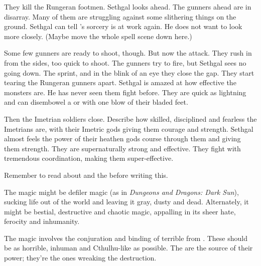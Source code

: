 They kill the Rungeran footmen.
Sethgal looks ahead. 
The gunners ahead are in disarray.
Many of them are struggling against some slithering things on the ground. 
Sethgal can tell \Shachar's sorcery is at work again. 
He does not want to look more closely. 
(Maybe move the whole spell scene down here.)

Some few gunners are ready to shoot, though. 
But now the \nycans attack. 
They rush in from the sides, too quick to shoot.
The gunners try to fire, but Sethgal sees no \nycans going down.
The \saurians sprint, and in the blink of an eye they close the gap. 
They start tearing the Rungeran gunners apart. 
Sethgal is amazed at how effective the monsters are.
He has never seen them fight before. 
They are quick as lightning and can disembowel a \human or \scatha with one blow of their bladed feet. 

Then the Imetrian soldiers close. 
Describe how skilled, disciplined and fearless the Imetrians are, with their Imetric gods giving them courage and strength. 
Sethgal almost feels the power of their heathen gods course through them and giving them strength. 
They are supernaturally strong and effective.
They fight with tremendous coordination, making them super-effective.


Remember to read about  and the \nycans{} before writing this. 





\begin{comment}
  \subsection{The magic of Eresh-Kal}
\end{comment}
\new
The \Rungertemple{} magic might be defiler magic (as in \emph{Dungeons and Dragons: Dark Sun}), sucking life out of the world and leaving it gray, dusty and dead. Alternately, it might be bestial, destructive and chaotic magic, appalling in its sheer hate, ferocity and inhumanity. 

The magic involves the conjuration and binding of terrible \daemons{} from \Chaos. These should be as horrible, inhuman and Cthulhu-like as possible. The \daemons{} are the source of their power; they're the ones wreaking the destruction. 

